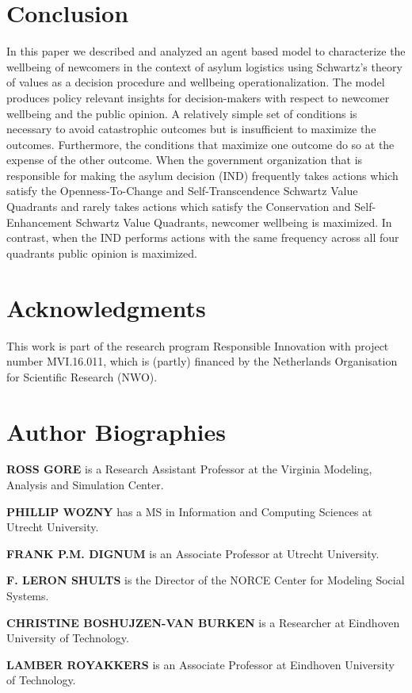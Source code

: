 \documentclass{scspaperproc}
\theoremstyle{scsthe}
\begin{document}
\section{Conclusion}
\label{sec:discussion}
In this paper we described and analyzed an agent based model to characterize the wellbeing of newcomers in the context of asylum logistics using Schwartz's theory of values as a decision procedure and wellbeing operationalization. The model produces policy relevant insights for decision-makers with respect to newcomer wellbeing and the public opinion. A relatively simple set of conditions is necessary to avoid catastrophic outcomes but is insufficient to maximize the outcomes. Furthermore, the conditions that maximize one outcome do so at the expense of the other outcome. When the government organization that is responsible for making the asylum decision (IND) frequently takes actions which satisfy the Openness-To-Change and Self-Transcendence Schwartz Value Quadrants and rarely takes actions which satisfy the Conservation and Self-Enhancement Schwartz Value Quadrants, newcomer wellbeing is maximized. In contrast, when the IND performs actions with the same frequency across all four quadrants public opinion is maximized. 
\section*{Acknowledgments}
This work is part of the research program Responsible Innovation with project number MVI.16.011, which is (partly) financed by the Netherlands Organisation for Scientific Research (NWO). %



\section*{Author Biographies}

\textbf{\uppercase{ROSS GORE}} is a Research Assistant Professor at the Virginia Modeling, Analysis and Simulation Center.

\textbf{\uppercase{PHILLIP WOZNY}} has a MS in Information and Computing Sciences at Utrecht University. 

\textbf{\uppercase{FRANK P.M. DIGNUM}} is an Associate Professor at Utrecht University.

\textbf{\uppercase{F. LERON SHULTS}} is the Director of the NORCE Center for Modeling Social Systems.

\textbf{\uppercase{CHRISTINE BOSHUJZEN-VAN BURKEN}} is a Researcher at Eindhoven University of Technology.

\textbf{\uppercase{LAMBER ROYAKKERS}} is an Associate Professor at Eindhoven University of Technology.
\end{document}
